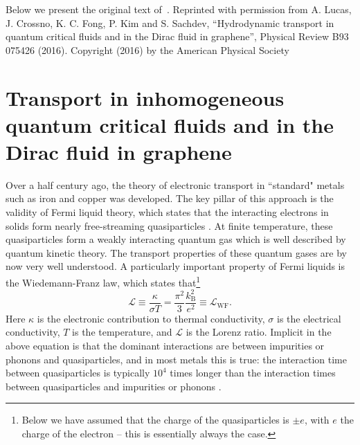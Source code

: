 Below we present the original text of~\cite{lucas_transport_2016}. Reprinted with permission from A. Lucas, J. Crossno, K. C. Fong, P. Kim and S. Sachdev, “Hydrodynamic transport in quantum critical fluids and in the Dirac fluid in graphene”, Physical Review B93 075426 (2016). Copyright (2016) by the American Physical Society

\section{Transport in inhomogeneous quantum critical fluids and in the Dirac fluid in graphene}
Over a half century ago, the theory of electronic transport in ``standard" metals such as iron and copper was developed.  The key pillar of this approach is the validity of Fermi liquid theory, which states that the interacting electrons in solids form nearly free-streaming quasiparticles \cite{pines_theory_1994}.  At finite temperature, these quasiparticles form a weakly interacting quantum gas which is well described by quantum kinetic theory.   The transport properties of these quantum gases are by now very well understood.   A particularly important property of Fermi liquids is the Wiedemann-Franz law, which states that\footnote{Below we have assumed that the charge of the quasiparticles is $\pm e$, with $e$ the charge of the electron -- this is essentially always the case.} \begin{equation}
\mathcal{L} \equiv \frac{\kappa}{\sigma T} = \frac{\pi^2}{3} \frac{k_{\mathrm{B}}^2}{e^2} \equiv \mathcal{L}_{\mathrm{WF}}.
\end{equation}
Here $\kappa$ is the electronic contribution to thermal conductivity, $\sigma$ is the electrical conductivity, $T$ is the temperature, and $\mathcal{L}$ is the Lorenz ratio.   Implicit in the above equation is that the dominant interactions are between impurities or phonons and quasiparticles, and in most metals this is true:  the interaction time between quasiparticles is typically $10^4$ times longer than the interaction times between quasiparticles and impurities or phonons \cite{ashcroft_solid_1976}.   

